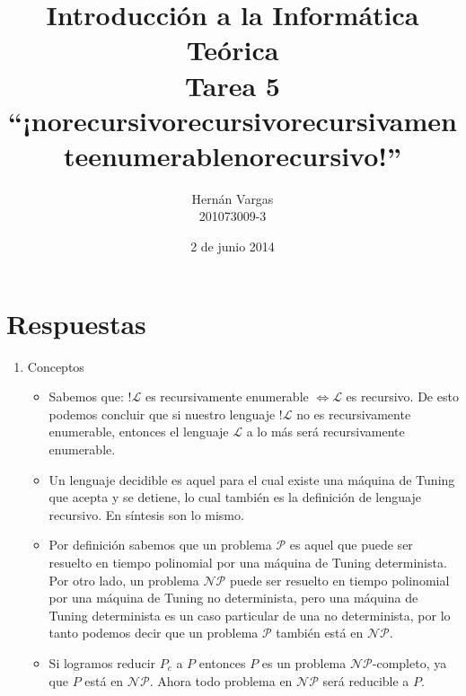 \documentclass[spanish, fleqn]{article}
\title{Introducción a la Informática Teórica \\
       Tarea 5 \\
       ``¡norecursivorecursivorecursivamenteenumerablenorecursivo!''
      }
\author{Hernán Vargas \\ 201073009-3}
\date{2 de junio 2014}
\begin{document}
\maketitle
\thispagestyle{empty}

\section*{Respuestas}

\begin{enumerate}
	\item
		Conceptos
		\begin{itemize}
			\item 
				Sabemos que: $!\mathcal{L}$ es recursivamente enumerable 
				$\Leftrightarrow \mathcal{L} $ es recursivo. De esto podemos
				concluir que si nuestro lenguaje $!\mathcal{L}$ no es
				recursivamente enumerable, entonces el lenguaje $\mathcal{L}$ a
				lo más será recursivamente enumerable.

			\item 
				Un lenguaje decidible es aquel para el cual existe una máquina
				de Tuning que acepta y se detiene, lo cual también es la
				definición de lenguaje recursivo. En síntesis son lo mismo.
			
			\item
				Por definición sabemos que un problema $\mathcal{P}$ es aquel
				que puede ser resuelto en tiempo polinomial por una máquina de
				Tuning determinista. Por otro lado, un problema $\mathcal{NP}$
				puede ser resuelto en tiempo polinomial por una máquina de 
				Tuning no determinista, pero una máquina de Tuning determinista
				es un caso particular de una no determinista, por lo tanto
				podemos decir que un problema $\mathcal{P}$ también está en 
				$\mathcal{NP}$.

			\item
				Si logramos reducir $P_c$ a $P$ entonces $P$ es un problema 
				$\mathcal{NP}$-completo, ya que $P$ está en $\mathcal{NP}$.
				Ahora todo problema en $\mathcal{NP}$ será reducible a $P$.


\end{itemize}
\end{enumerate}
\end{document}
